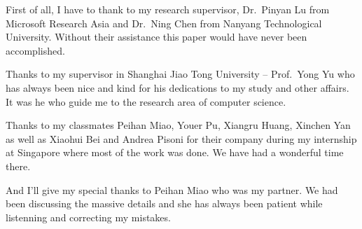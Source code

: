 First of all, I have to thank to my research supervisor, 
Dr.\ Pinyan Lu from Microsoft Research Asia and Dr.\ Ning Chen from
Nanyang Technological University. Without their assistance this paper
would have never been accomplished.

Thanks to my supervisor in Shanghai Jiao Tong University -- Prof.\ Yong Yu
who has always been nice and kind
for his dedications to my study and other affairs.
It was he who guide me to the research area of computer science.

Thanks to my classmates Peihan Miao, Youer Pu, Xiangru Huang, Xinchen Yan
as well as Xiaohui Bei and Andrea Pisoni
for their company during my internship at Singapore where most of the work
was done. We have had a wonderful time there.

And I'll give my special thanks to Peihan Miao who was my partner.
We had been discussing the massive details and she has always been patient
while listenning and correcting my mistakes.


